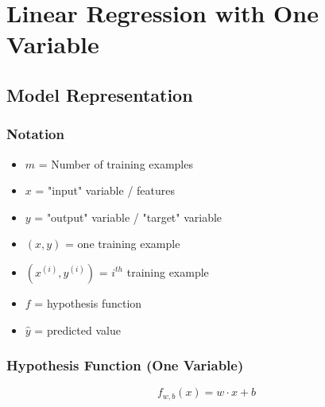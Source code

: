 \chapter{Linear Regression with One Variable}
\section{Model Representation}
\subsection*{Notation}
\begin{itemize}
\item $m$ = Number of training examples
\item $x$ = "input" variable / features
\item $y$ = "output" variable / "target" variable
\item $(x, y)$ = one training example
\item $(x^{(i)}, y^{(i)})$ = $i^{th}$ training example
\item $f$ = hypothesis function
\item $\hat{y}$ = predicted value
\end{itemize}
\subsection*{Hypothesis Function (One Variable)}
\begin{notebox}
\begin{equation}
f_{w,b}(x) = w \cdot x + b
\end{equation}
\end{notebox}